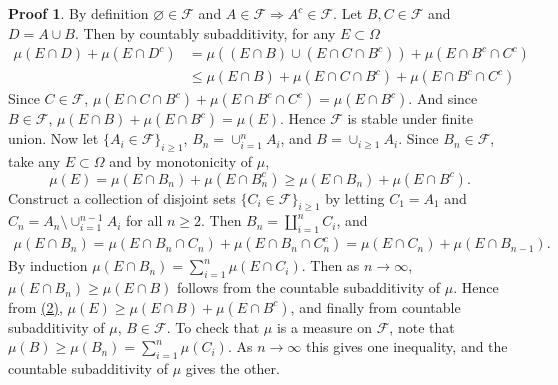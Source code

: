 \documentclass[hidelinks,11pt]{article}
\theoremstyle{definition}
\theoremstyle{dotless}
\newtheorem{prop}{Proof}[section]
\theoremstyle{remark}
\DeclareMathOperator{\1}{\mathbf{1}}
\begin{document}
\begin{prop}
By definition $\varnothing\in\mathcal{F}$ and $A\in\mathcal{F}\Rightarrow A^c\in\mathcal{F}$. Let $B,C\in\mathcal{F}$ and $D=A\cup B$. Then by countably subadditivity, for any $E\subset\Omega$
\begin{align*}
\mu(E\cap D)+\mu(E\cap D^c)&=\mu((E\cap B)\cup(E\cap C\cap B^c))+\mu(E\cap B^c\cap C^c)\\
&\leq\mu(E\cap B)+\mu(E\cap C\cap B^c)+\mu(E\cap B^c\cap C^c)
\end{align*}
Since $C\in\mathcal{F}$, $\mu(E\cap C\cap B^c)+\mu(E\cap B^c\cap C^c)=\mu(E\cap B^c)$. And since $B\in\mathcal{F}$, $\mu(E\cap B)+\mu(E\cap B^c)=\mu(E)$. Hence $\mathcal{F}$ is stable under finite union.\medbreak
Now let $\{A_i\in\mathcal{F}\}_{i\geq1}$, $B_n=\cup_{i=1}^nA_i$, and $B=\cup_{i\geq1}A_i$. Since $B_n\in\mathcal{F}$, take any $E\subset\Omega$ and by monotonicity of $\mu$,
\[\mu(E)=\mu(E\cap B_n)+\mu(E\cap B_n^c)\geq\mu(E\cap B_n)+\mu(E\cap B^c).\]
Construct a collection of disjoint sets $\{C_i\in\mathcal{F}\}_{i\geq1}$ by letting $C_1=A_1$ and $C_n=A_n\setminus\cup_{i=1}^{n-1}A_i$ for all $n\geq2$. Then $B_n=\amalg_{i=1}^nC_i$, and
\begin{align}\label{(2)}
\mu(E\cap B_n)=\mu(E\cap B_n\cap C_n)+\mu(E\cap B_n\cap C_n^c)=\mu(E\cap C_n)+\mu(E\cap B_{n-1}).
\end{align}
By induction $\mu(E\cap B_n)=\sum_{i=1}^n\mu(E\cap C_i)$. Then as $n\to\infty$, $\mu(E\cap B_n)\geq\mu(E\cap B)$ follows from the countable subadditivity of $\mu$. Hence from \hyperref[(2)]{(2)}, $\mu(E)\geq\mu(E\cap B)+\mu(E\cap B^c)$, and finally from countable subadditivity of $\mu$, $B\in\mathcal{F}$.
\medbreak
To check that $\mu$ is a measure on $\mathcal{F}$, note that $\mu(B)\geq\mu(B_n)=\sum_{i=1}^n\mu(C_i)$. As $n\to\infty$ this gives one inequality, and the countable subadditivity of $\mu$ gives the other.
\end{prop}
\end{document}
